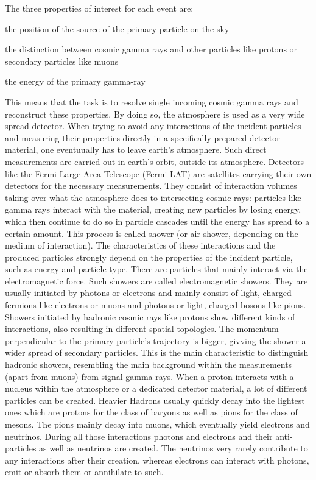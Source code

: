 The three properties of interest for each event are:
%
\begin{description}[labelsep=1em, align=right]
  \item[source position]{the position of the source of the primary particle on the sky}
  \item[particle type]{the distinction between cosmic gamma rays and other particles like protons or secondary particles like muons}
  \item[particle energy]{the energy of the primary gamma-ray}
\end{description}
%
This means that the task is to resolve single incoming cosmic gamma rays and
reconstruct these properties. By doing so, the atmosphere is used as a very
wide spread detector. When trying to avoid any interactions of the incident
particles and measuring their properties directly in a specifically prepared
detector material, one eventuually has to leave earth's atmosphere. Such direct
measurements are carried out in earth's orbit, outside its atmosphere.
Detectors like the Fermi Large-Area-Telescope (Fermi LAT) are satellites
carrying their own detectors for the necessary measurements. They consist of
interaction volumes taking over what the atmosphere does to intersecting cosmic
rays: particles like gamma rays interact with the material, creating new
particles by losing energy, which then continue to do so in particle cascades
until the energy has spread to a certain amount. This process is called
shower (or air-shower, depending on the medium of interaction). The
characteristics of these interactions and the produced particles strongly
depend on the properties of the incident particle, such as energy and particle
type. There are particles that mainly interact via the electromagnetic force.
Such showers are called electromagnetic showers. They are usually initiated by
photons or electrons and mainly consist of light, charged fermions like electrons or
muons and photons or light, charged bosons like pions. Showers initiated by
hadronic cosmic rays like protons show different kinds of interactions, also
resulting in different spatial topologies. The momentum perpendicular to the
primary particle's trajectory is bigger, givving the shower a wider spread of
secondary particles. This is the main characteristic to distinguish hadronic
showers, resembling the main background within the measurements (apart from
muons) from signal gamma rays. When a proton interacts with a
nucleus within the atmosphere or a dedicated detector material, a lot of
different particles can be created. Heavier Hadrons usually quickly decay into
the lightest ones which are protons for the class of baryons as well as pions
for the class of mesons. The pions mainly decay into muons, which eventually
yield electrons and neutrinos. During all those interactions photons and
electrons and their anti-particles as well as neutrinos are created. The
neutrinos very rarely contribute to any interactions after their creation,
whereas electrons can interact with photons, emit or absorb them or annihilate
to such.

